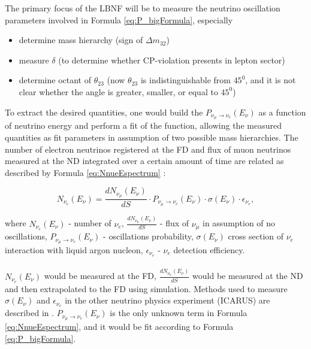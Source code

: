 The primary focus of the LBNF will be to measure the neutrino oscillation parameters involved in Formula \ref{eq:P_bigFormula}, especially 
\begin{itemize}
\item determine mass hierarchy (sign of $\Delta{m_{32}}$)
\item measure $\delta$ (to determine whether CP-violation presents in lepton sector)
\item determine octant of $\theta_{23}$ (now $\theta_{23}$ is indistinguishable from $45^0$, and it is not clear whether the angle is greater, smaller, or equal to $45^0$)
\end{itemize}
To extract the desired quantities, one would build the $P_{\nu_\mu \rightarrow \nu_e}(E_{\nu})$ as a function of neutrino energy and perform a fit of the function, allowing the measured quantities as fit parameters in assumption of two possible mass hierarchies. The number of electron neutrinos registered at the FD and flux of muon neutrinos measured at the ND integrated over a certain amount of time are related as described by Formula \ref{eq:NnueEspectrum} \cite{ref_LisaWhitehead}: \\ 
\begin{center}
\begin{equation}
\label{eq:NnueEspectrum}
N_{\nu_e}(E_{\nu}) = \frac{dN_{\nu_\mu}(E_{\nu})}{dS} \cdot P_{\nu_\mu \rightarrow \nu_e}(E_{\nu}) \cdot \sigma(E_{\nu}) \cdot \epsilon_{\nu_e}, 
\end{equation}
\end{center}
where $N_{\nu_e}(E_{\nu})$ - number of $\nu_e$, $\frac{dN_{\nu_\mu}(E_{\nu})}{dS}$ - flux of $\nu_\mu$ in assumption of no oscillations, $P_{\nu_\mu \rightarrow \nu_e}(E_{\nu})$ - oscillations probability, $\sigma(E_{\nu})$ cross section of $\nu_e$ interaction with liquid argon nucleon, $\epsilon_{\nu_e}$ - $\nu_e$ detection efficiency.\\ \\
$N_{\nu_e}(E_{\nu})$ would be measured at the FD, $\frac{dN_{\nu_\mu}(E_{\nu})}{dS}$ would be measured at the ND and then extrapolated to the FD using simulation. Methods used to measure $\sigma(E_{\nu})$ and $\epsilon_{\nu_e}$ in the other neutrino physics experiment (ICARUS) are described in \cite{ref_eff_ICARUS}. $P_{\nu_\mu \rightarrow \nu_e}(E_{\nu})$ is the only unknown term in Formula \ref{eq:NnueEspectrum}, and it would be fit according to Formula \ref{eq:P_bigFormula}.\\ \\
